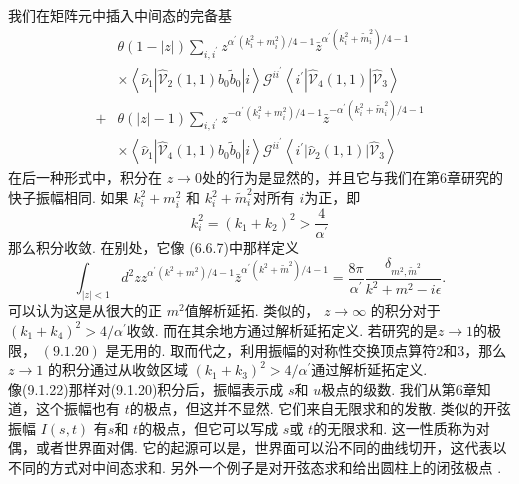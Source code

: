 我们在矩阵元中插入中间态的完备基
\begin{equation}
	\begin{aligned}
		&\theta(1-|z|) \sum_{i, i^{\prime}} z^{\alpha^{\prime}\left(k_{i}^{2}+m_{i}^{2}\right) / 4-1} \bar{z}^{\alpha^{\prime}\left(k_{i}^{2}+\tilde{m}_{i}^{2}\right) / 4-1} \\
	&\times\left\langle\hat{\nu}_{1}\left|\hat{\mathscr{V}}_{2}(1,1) b_{0} \tilde{b}_{0}\right| i\right\rangle \mathscr{G}^{i i^{\prime}}\left\langle i^{\prime}\left|\hat{\mathscr{V}}_{4}(1,1)\right| \hat{\mathscr{V}}_{3}\right\rangle \\
		+&\theta(|z|-1) \sum_{i, i^{\prime}} z^{-\alpha^{\prime}\left(k_{i}^{2}+m_{i}^{2}\right) / 4-1} \bar{z}^{-\alpha^{\prime}\left(k_{i}^{2}+\tilde{m}_{i}^{2}\right) / 4-1} \\
		&\times\left\langle\hat{\nu}_{1}\left|\hat{\mathscr{V}}_{4}(1,1) b_{0} \tilde{b}_{0}\right| i\right\rangle \mathscr{G}^{i i^{\prime}}\left\langle i^{\prime}\left|\hat{\nu}_{2}(1,1)\right| \hat{\mathscr{V}}_{3}\right\rangle
	\end{aligned}
\end{equation}
在后一种形式中，积分在 $z \rightarrow 0$处的行为是显然的，并且它与我们在第6章研究的快子振幅相同. 如果 $k_{i}^{2}+m_{i}^{2}$ 和 $k_{i}^{2}+\tilde{m}_{i}^{2}$对所有 $i$为正，即
\begin{equation}
	k_{i}^{2}=\left(k_{1}+k_{2}\right)^{2}>\frac{4}{\alpha^{\prime}}
\end{equation}
那么积分收敛. 在别处，它像 (6.6.7)中那样定义
\begin{equation}
	\int_{|z|<1} d^{2} z z^{\alpha^{\prime}\left(k^{2}+m^{2}\right) / 4-1} \bar{z}^{\alpha^{\prime}\left(k^{2}+\tilde{m}^{2}\right) / 4-1}=\frac{8 \pi}{\alpha^{\prime}} \frac{\delta_{m^{2}, \tilde{m}^{2}}}{k^{2}+m^{2}-i \epsilon} .
\end{equation}
可以认为这是从很大的正 $m^{2}$值解析延拓. 类似的， $z \rightarrow \infty$ 的积分对于$\left(k_{1}+k_{4}\right)^{2}>4 / \alpha^{\prime}$收敛. 而在其余地方通过解析延拓定义. 若研究的是$z \rightarrow 1$的极限， $(9.1 .20)$ 是无用的. 取而代之，利用振幅的对称性交换顶点算符2和3，那么 $z \rightarrow 1$ 的积分通过从收敛区域 $\left(k_{1}+k_{3}\right)^{2}>4 / \alpha^{\prime} $通过解析延拓定义.\\
像(9.1.22)那样对(9.1.20)积分后，振幅表示成 $s$和 $u$极点的级数. 我们从第6章知道，这个振幅也有 $t$的极点，但这并不显然. 它们来自无限求和的发散. 类似的开弦振幅 $I(s, t)$ 有$s$和 $t$的极点，但它可以写成 $s$或 $t$的无限求和. 这一性质称为对偶，或者世界面对偶. 它的起源可以是，世界面可以沿不同的曲线切开，这代表以不同的方式对中间态求和. 另外一个例子是对开弦态求和给出圆柱上的闭弦极点 .

